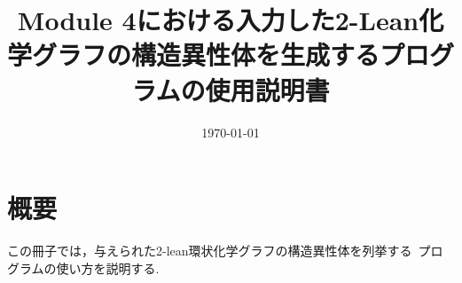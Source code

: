 \documentclass[11pt,titlepage,dvipdfmx,twoside]{jarticle}
\title{\huge{Module 4における入力した2-Lean化学グラフの構造異性体を生成するプログラムの使用説明書}}
\author{\project}
\begin{document}
\makeatletter 
\let\c@lstlisting\c@figure
\makeatother

\date{\today}

\maketitle


\thispagestyle{empty}
\tableofcontents
\clearpage


\section{概要}
この冊子では，与えられた2-lean環状化学グラフの構造異性体を列挙する~\cite{branch}プログラムの使い方を説明する.
\end{document}
